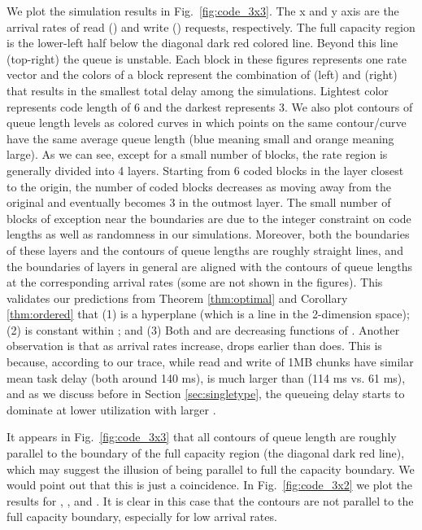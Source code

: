 \documentclass[journal]{IEEEtran}
\begin{document}
 We plot the simulation results in Fig.~\ref{fig:code_3x3}. The x and y axis are the arrival rates of read () and write ()  requests, respectively. The full capacity region is the lower-left half below the diagonal dark red colored line. Beyond this line (top-right) the queue is unstable. Each block in these figures represents one rate vector and the colors of a block represent the combination of  (left) and  (right) that results in the smallest total delay among the simulations. Lightest color represents code length of 6 and the darkest represents 3. We also plot contours of queue length levels as colored curves in which points on the same contour/curve have the same average queue length (blue meaning small and orange meaning large).  As we can see, except for a small number of blocks, the rate region is generally divided into 4 layers. Starting from 6 coded blocks in the layer closest to the origin, the number of coded blocks decreases as moving away from the original and eventually becomes 3 in the outmost layer. The small number of blocks of exception near the boundaries are due to the integer constraint on code lengths as well as  randomness in our simulations. Moreover, both the boundaries of these layers and the contours of queue lengths are roughly straight lines, and the boundaries of layers in general are aligned  with the contours of queue lengths at the corresponding arrival rates (some are not shown in the figures). This validates our predictions from Theorem \ref{thm:optimal} and Corollary \ref{thm:ordered} that (1)  is a hyperplane (which is a line in the 2-dimension space); (2)  is constant within ; and (3) Both  and  are decreasing functions of . 
Another observation is that as arrival rates increase,  drops earlier than  does. This is because, according to our trace, while read and write of 1MB chunks have similar mean task delay (both around 140 ms),  is much larger than  (114 ms vs. 61 ms), and as we discuss before in Section \ref{sec:singletype}, the queueing delay starts to dominate at lower utilization with larger . 

It appears in Fig.~\ref{fig:code_3x3} that all contours of queue length are roughly parallel to the boundary of the full capacity region (the diagonal dark red line), which may suggest the illusion of  being parallel to full the capacity boundary. We would  point out that this is just a coincidence. In Fig.~\ref{fig:code_3x2} we plot the results for , , and . It is clear in this case that the contours are not parallel to the full capacity boundary, especially for low arrival rates. 
\end{document}
